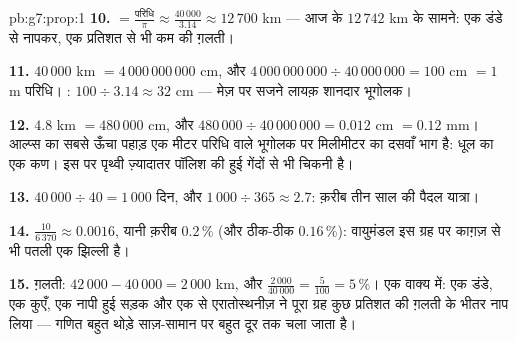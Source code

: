 \begin{solution}{pb:g7:prop:1}
\textbf{10.}  $= \frac{\text{परिधि}}{\pi}
\approx \frac{40\,000}{3.14} \approx 12\,700$ km --- आज के
$12\,742$ km के सामने: एक डंडे से नापकर, एक प्रतिशत से भी कम की
ग़लती।

\textbf{11.} $40\,000$ km $= 4\,000\,000\,000$ cm, और
$4\,000\,000\,000 \div 40\,000\,000 = 100$ cm $= 1$ m परिधि।
: $100 \div 3.14 \approx 32$ cm --- मेज़ पर सजने लायक़ शानदार
भूगोलक।

\textbf{12.} $4.8$ km $= 480\,000$ cm, और
$480\,000 \div 40\,000\,000 = 0.012$ cm $= 0.12$ mm। आल्प्स का
सबसे ऊँचा पहाड़ एक मीटर परिधि वाले भूगोलक पर मिलीमीटर का दसवाँ
भाग है: धूल का एक कण। इस  पर पृथ्वी ज़्यादातर पॉलिश की हुई
गेंदों से भी चिकनी है।

\textbf{13.} $40\,000 \div 40 = 1\,000$ दिन, और
$1\,000 \div 365 \approx 2.7$: क़रीब तीन साल की पैदल यात्रा।

\textbf{14.} $\frac{10}{6\,370} \approx 0.0016$, यानी क़रीब
$0.2\,\%$ (और ठीक-ठीक $0.16\,\%$): वायुमंडल इस ग्रह पर काग़ज़ से
भी पतली एक झिल्ली है।

\textbf{15.} ग़लती: $42\,000 - 40\,000 = 2\,000$ km, और
$\frac{2\,000}{40\,000} = \frac{5}{100} = 5\,\%$। एक वाक्य में:
एक डंडे, एक कुएँ, एक नापी हुई सड़क और एक  से एरातोस्थनीज़
ने पूरा ग्रह कुछ प्रतिशत की ग़लती के भीतर नाप लिया --- गणित बहुत
थोड़े साज़-सामान पर बहुत दूर तक चला जाता है।

\end{solution}
